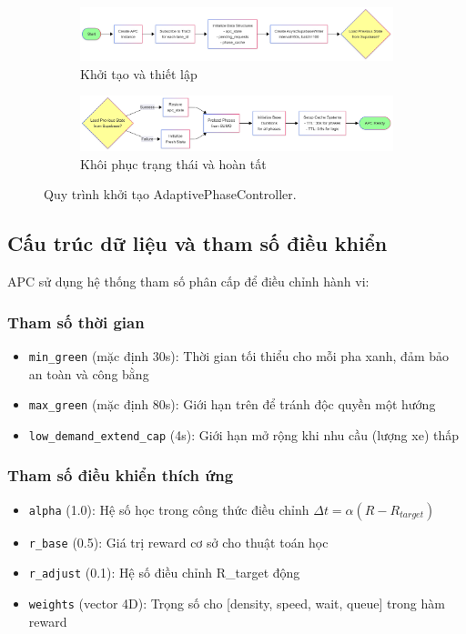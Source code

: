 \begin{figure}[H]
    \centering
    \begin{subfigure}[b]{0.65\textwidth}
        \centering
        \includegraphics[width=1.1\textwidth]{Untitled diagram _ Mermaid Chart-2025-08-21-084042.png}
        \caption{Khởi tạo và thiết lập}
    \end{subfigure}
    \hfill
    \begin{subfigure}[b]{0.65\textwidth}
        \centering
        \includegraphics[width=1.1\textwidth]{Untitled diagram _ Mermaid Chart-2025-08-21-084132.png}
        \caption{Khôi phục trạng thái và hoàn tất}
    \end{subfigure}
    \caption{Quy trình khởi tạo AdaptivePhaseController.}
    \label{fig:apc_init_flow}
\end{figure}
\subsection{Cấu trúc dữ liệu và tham số điều khiển}

APC sử dụng hệ thống tham số phân cấp để điều chỉnh hành vi:

\subsubsection{Tham số thời gian}
\begin{itemize}
    \item \texttt{min\_green} (mặc định 30s): Thời gian tối thiểu cho mỗi pha xanh, đảm bảo an toàn và công bằng
    \item \texttt{max\_green} (mặc định 80s): Giới hạn trên để tránh độc quyền một hướng
    \item \texttt{low\_demand\_extend\_cap} (4s): Giới hạn mở rộng khi nhu cầu (lượng xe) thấp
\end{itemize}

\subsubsection{Tham số điều khiển thích ứng}
\begin{itemize}
    \item \texttt{alpha} (1.0): Hệ số học trong công thức điều chỉnh $\Delta t = \alpha(R - R_{target})$
    \item \texttt{r\_base} (0.5): Giá trị reward cơ sở cho thuật toán học
    \item \texttt{r\_adjust} (0.1): Hệ số điều chỉnh R\_target động
    \item \texttt{weights} (vector 4D): Trọng số cho [density, speed, wait, queue] trong hàm reward
\end{itemize}

